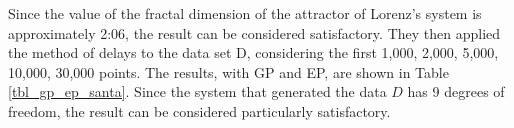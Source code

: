 \documentclass[journal]{IEEEtran}
\begin{document}
Since the value of the fractal dimension of the attractor of Lorenz’s system is approximately 2:06, the result can be considered satisfactory.
They then applied the method of delays to the data set D, considering the first 1,000, 2,000, 5,000, 10,000, 30,000 points. 
The results, with GP and EP, are shown in Table \ref{tbl_gp_ep_santa}. Since the system that generated the data \(D\) has 9 degrees of freedom, 
the result can be considered particularly satisfactory.


%
%



%
%
\end{document}
